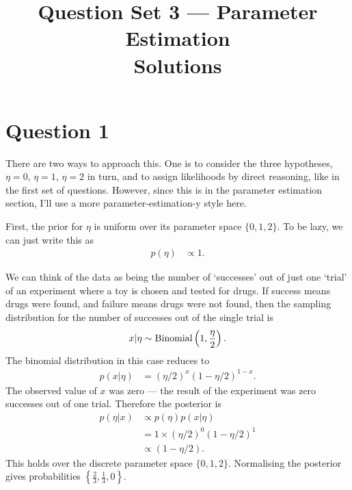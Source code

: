 \documentclass[a4paper, 12pt]{article}
\title{Question Set 3 --- Parameter Estimation\\Solutions}
\author{}
\date{}
\begin{document}
\maketitle


\setlength{\parindent}{0pt}
\setlength{\parskip}{8pt}

\section*{Question 1}

There are two ways to approach this. One is to consider the three
hypotheses, $\eta=0$, $\eta=1$, $\eta=2$ in turn, and to assign
likelihoods by direct reasoning, like in the first set of questions.
However, since this is in the parameter estimation section, I'll use
a more parameter-estimation-y style here.

First, the prior for $\eta$ is uniform over its parameter
space $\{0,1,2\}$. To be lazy, we can just write
this as
\begin{align}
p(\eta) &\propto 1.
\end{align}

We can think of the data as being the number of `successes'
out of just one `trial' of an experiment where a toy is chosen
and tested for drugs. If success means drugs were found,
and failure means drugs were not found, then the
sampling distribution for the number of successes out of the
single trial is
\begin{align}
x | \eta \sim \textnormal{Binomial}\left(1, \frac{\eta}{2}\right).
\end{align}
The binomial distribution in this case reduces to
\begin{align}
p(x | \eta) &= (\eta/2)^x(1 - \eta/2)^{1-x}.
\end{align}
The observed value of $x$ was zero --- the result of the experiment
was zero successes out of one trial. Therefore the posterior is
\begin{align}
p(\eta | x) &\propto p(\eta)p(x|\eta)\\
            &= 1 \times (\eta/2)^0(1 - \eta/2)^{1} \\
            &\propto (1 - \eta/2).
\end{align}
This holds over the discrete parameter space $\{0,1,2\}$. Normalising
the posterior gives probabilities $\left\{\frac{2}{3}, \frac{1}{3} ,0\right\}$.
\end{document}
